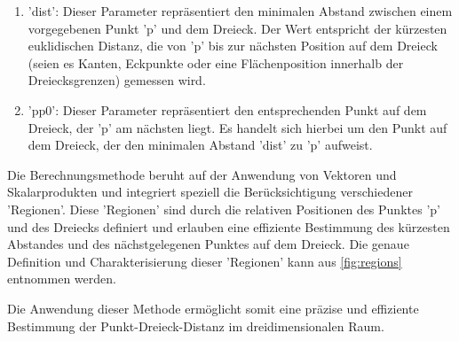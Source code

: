\documentclass[conference]{IEEEtran}
\begin{document}
\begin{enumerate}
\item 'dist': Dieser Parameter repräsentiert den minimalen Abstand zwischen einem vorgegebenen Punkt 'p' und dem Dreieck. Der Wert entspricht der kürzesten euklidischen Distanz, die von 'p' bis zur nächsten Position auf dem Dreieck (seien es Kanten, Eckpunkte oder eine Flächenposition innerhalb der Dreiecksgrenzen) gemessen wird.
\item 'pp0': Dieser Parameter repräsentiert den entsprechenden Punkt auf dem Dreieck, der 'p' am nächsten liegt. Es handelt sich hierbei um den Punkt auf dem Dreieck, der den minimalen Abstand 'dist' zu 'p' aufweist.
\end{enumerate}

Die Berechnungsmethode beruht auf der Anwendung von Vektoren und Skalarprodukten und integriert speziell die Berücksichtigung verschiedener 'Regionen'. Diese 'Regionen' sind durch die relativen Positionen des Punktes 'p' und des Dreiecks definiert und erlauben eine effiziente Bestimmung des kürzesten Abstandes und des nächstgelegenen Punktes auf dem Dreieck. Die genaue Definition und Charakterisierung dieser 'Regionen' kann aus \ref{fig:regions} entnommen werden.

Die Anwendung dieser Methode ermöglicht somit eine präzise und effiziente Bestimmung der Punkt-Dreieck-Distanz im dreidimensionalen Raum.
\end{document}
